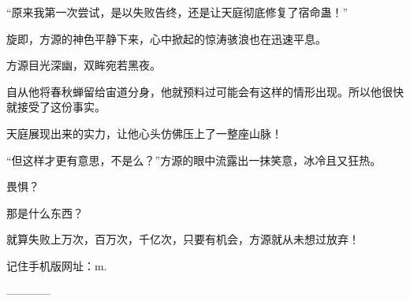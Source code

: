 \begin{this_body}
“原来我第一次尝试，是以失败告终，还是让天庭彻底修复了宿命蛊！”

旋即，方源的神色平静下来，心中掀起的惊涛骇浪也在迅速平息。

方源目光深幽，双眸宛若黑夜。

自从他将春秋蝉留给宙道分身，他就预料过可能会有这样的情形出现。所以他很快就接受了这份事实。

天庭展现出来的实力，让他心头仿佛压上了一整座山脉！

“但这样才更有意思，不是么？”方源的眼中流露出一抹笑意，冰冷且又狂热。

畏惧？

那是什么东西？

就算失败上万次，百万次，千亿次，只要有机会，方源就从未想过放弃！

记住手机版网址：m.

------------

\end{this_body}

